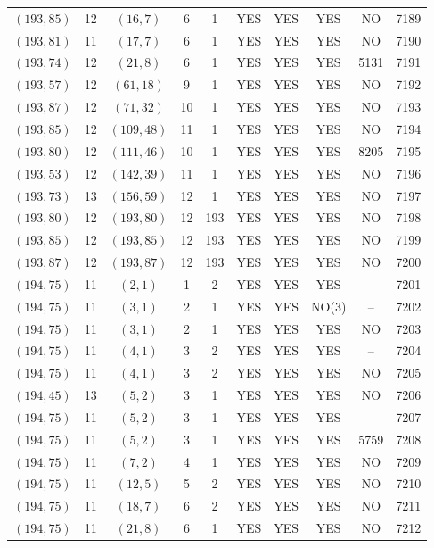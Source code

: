 \begin{longtable}{|c|c|c|c|c|c|c|c|c|c|}
$(193, 85)$ & 12 & $(16, 7)$ & 6 & 1 & YES & YES & YES & NO & 7189\\
$(193, 81)$ & 11 & $(17, 7)$ & 6 & 1 & YES & YES & YES & NO & 7190\\
$(193, 74)$ & 12 & $(21, 8)$ & 6 & 1 & YES & YES & YES & 5131 & 7191\\
$(193, 57)$ & 12 & $(61, 18)$ & 9 & 1 & YES & YES & YES & NO & 7192\\
$(193, 87)$ & 12 & $(71, 32)$ & 10 & 1 & YES & YES & YES & NO & 7193\\
$(193, 85)$ & 12 & $(109, 48)$ & 11 & 1 & YES & YES & YES & NO & 7194\\
$(193, 80)$ & 12 & $(111, 46)$ & 10 & 1 & YES & YES & YES & 8205 & 7195\\
$(193, 53)$ & 12 & $(142, 39)$ & 11 & 1 & YES & YES & YES & NO & 7196\\
$(193, 73)$ & 13 & $(156, 59)$ & 12 & 1 & YES & YES & YES & NO & 7197\\
$(193, 80)$ & 12 & $(193, 80)$ & 12 & 193 & YES & YES & YES & NO & 7198\\
$(193, 85)$ & 12 & $(193, 85)$ & 12 & 193 & YES & YES & YES & NO & 7199\\
$(193, 87)$ & 12 & $(193, 87)$ & 12 & 193 & YES & YES & YES & NO & 7200\\
$(194, 75)$ & 11 & $(2, 1)$ & 1 & 2 & YES & YES & YES & -- & 7201\\
$(194, 75)$ & 11 & $(3, 1)$ & 2 & 1 & YES & YES & NO(3) & -- & 7202\\
$(194, 75)$ & 11 & $(3, 1)$ & 2 & 1 & YES & YES & YES & NO & 7203\\
$(194, 75)$ & 11 & $(4, 1)$ & 3 & 2 & YES & YES & YES & -- & 7204\\
$(194, 75)$ & 11 & $(4, 1)$ & 3 & 2 & YES & YES & YES & NO & 7205\\
$(194, 45)$ & 13 & $(5, 2)$ & 3 & 1 & YES & YES & YES & NO & 7206\\
$(194, 75)$ & 11 & $(5, 2)$ & 3 & 1 & YES & YES & YES & -- & 7207\\
$(194, 75)$ & 11 & $(5, 2)$ & 3 & 1 & YES & YES & YES & 5759 & 7208\\
$(194, 75)$ & 11 & $(7, 2)$ & 4 & 1 & YES & YES & YES & NO & 7209\\
$(194, 75)$ & 11 & $(12, 5)$ & 5 & 2 & YES & YES & YES & NO & 7210\\
$(194, 75)$ & 11 & $(18, 7)$ & 6 & 2 & YES & YES & YES & NO & 7211\\
$(194, 75)$ & 11 & $(21, 8)$ & 6 & 1 & YES & YES & YES & NO & 7212\\

\end{longtable}
